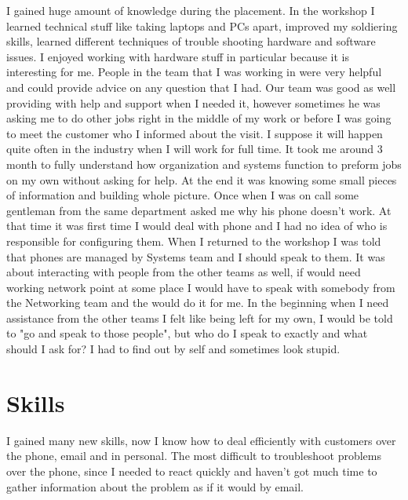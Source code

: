 \documentclass[10pt,a4paper,headinclude=true]{report}
\begin{document}
I gained huge amount of knowledge during the placement. In the workshop I learned technical stuff like taking laptops and PCs apart, improved my soldiering skills, learned different techniques of trouble shooting hardware and software issues. I enjoyed working with hardware stuff in particular because it is interesting for me. People in the team that I was working in were very helpful and could provide advice on any question that I had. Our team was good as well providing with help and support when I needed it, however sometimes he was asking me to do other jobs right in the middle of my work or before I was going to meet the customer who I informed about the visit. I suppose it will happen quite often in the industry when I will work for full time. It took me around 3 month to fully understand how organization and systems function to preform jobs on my own without asking for help. At the end it was knowing some small pieces of information and building whole picture. Once when I was on call some gentleman from the same department asked me why his phone doesn't work. At that time it was first time I would deal with phone and I had no idea of who is responsible for configuring them. When I returned to the workshop I was told that phones are managed by Systems team and I should speak to them. It was about interacting with people from the other teams as well, if would need working network point at some place I would have to speak with somebody from the Networking team and the would do it for me. In the beginning when I need assistance from the other teams I felt like being left for my own, I would be told to "go and speak to those people", but who do I speak to exactly and what should I ask for? I had to find out by self and sometimes look stupid.

\section{Skills}
I gained many new skills, now I know how to deal efficiently with customers over the phone, email and in personal. The most difficult to troubleshoot problems over the phone, since I needed to react quickly and haven't got much time to gather information about the problem as if it would by email. 



\end{document}
